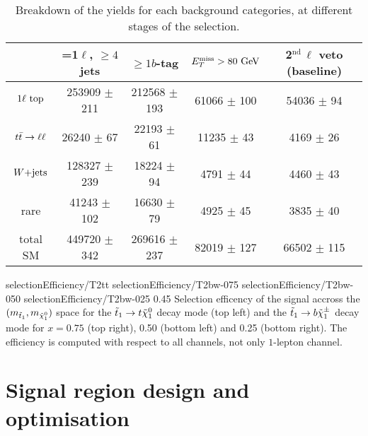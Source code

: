         \begin{table}[h!]
            \hspace*{-0.7cm}
            \begin{tabular}{|c|cccc|}
                \hline
                                 & =1$\ell$, $\geq 4$ jets   & $\geq 1b$-tag      & $E_T^\text{miss} > 80 ~\text{GeV}$  &  2$^\text{nd}\, \ell$ veto (baseline) \\
                \hline
                $1\ell~\text{top}$  & 253909 $\pm$ 211          & 212568 $\pm$ 193   &  61066 $\pm$ 100  & 54036 $\pm$ 94     \\
                $t\bar{t} \rightarrow \ell \ell$   &  26240 $\pm$ 67           &  22193 $\pm$ 61    &  11235 $\pm$ 43   &  4169 $\pm$ 26     \\
                $\text{$W$+jets}$         & 128327 $\pm$ 239          &  18224 $\pm$ 94    &   4791 $\pm$ 44   &  4460 $\pm$ 43     \\
                rare             &  41243 $\pm$ 102          &  16630 $\pm$ 79    &   4925 $\pm$ 45   &  3835 $\pm$ 40     \\
                \hline                                                            
                total SM         & 449720 $\pm$ 342          & 269616 $\pm$ 237   &  82019 $\pm$ 127  & 66502 $\pm$ 115    \\
                \hline
            \end{tabular}
            \caption{Breakdown of the yields for each background categories, at different stages of the selection.}
            \label{tab:cutflowPreselection}
        \end{table}

                          {selectionEfficiency/T2tt}
                          {selectionEfficiency/T2bw-075}
                          {selectionEfficiency/T2bw-050}
                          {selectionEfficiency/T2bw-025}
                          {0.45}
                          {Selection efficency of the signal accross the $(m_{\tilde{t}_1},m_{\tilde{\chi}_1^0})$ space for the $\tilde{t}_1 \rightarrow t \tilde{\chi}_1^0$ decay mode (top left) and the $\tilde{t}_1 \rightarrow b \tilde{\chi}_1^\pm$ decay mode for $x = 0.75$ (top right), 0.50 (bottom left) and 0.25 (bottom right). The efficiency is computed with respect to all channels, not only $1$-lepton channel.}


    \section{Signal region design and optimisation \label{sec:analysis_optimization}}

